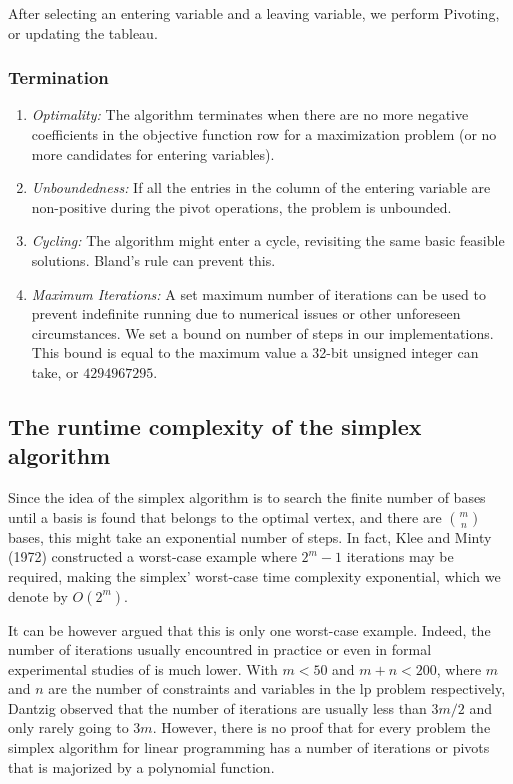 After selecting an entering variable and a leaving variable, we perform Pivoting, or 
updating the tableau. 

\subsubsection{Termination}
\begin{enumerate}
    \item \textit{Optimality:}
    The algorithm terminates when there are no more negative coefficients in the objective function
     row for a maximization problem (or no more candidates for entering variables).

    \item \textit{Unboundedness:}
    If all the entries in the column of the entering variable are non-positive during the pivot
     operations, the problem is unbounded.

    \item \textit{Cycling:}
    The algorithm might enter a cycle, revisiting the same basic feasible solutions. Bland's rule 
    can prevent this.

    \item \textit{Maximum Iterations:}
    A set maximum number of iterations can be used to prevent indefinite running due to 
    numerical issues or other unforeseen circumstances. We set a bound on number of steps in our 
    implementations. This bound is equal to the maximum value a 32-bit unsigned integer can take, or 
    $4294967295$.
\end{enumerate}

\subsection{The runtime complexity of the simplex algorithm}
Since the idea of the simplex algorithm is to search the finite number of bases until a basis is
found that belongs to the optimal vertex, and there are $\binom{m}{n}$ bases, this might take
an exponential number of steps.
In fact, Klee and Minty (1972) \parencite{klee1972good} constructed a worst-case example where
$2^m -1$ iterations may be required, making the simplex'
worst-case time complexity exponential, which we denote by \( O(2^m) \).

It can be however argued that this is only one worst-case example. Indeed, the number
of iterations usually encountred in practice or even in formal experimental studies of is much lower.
With $m<50$ and $m+n<200$, where $m$ and $n$ are the number of constraints and variables in the \gls{lp}
problem respectively, Dantzig observed that the number of iterations are usually less than $3m/2$
and only rarely going to $3m$. However, there is no proof that for every
problem the simplex algorithm for
linear programming has a number of iterations or pivots that
is majorized by a polynomial function.

